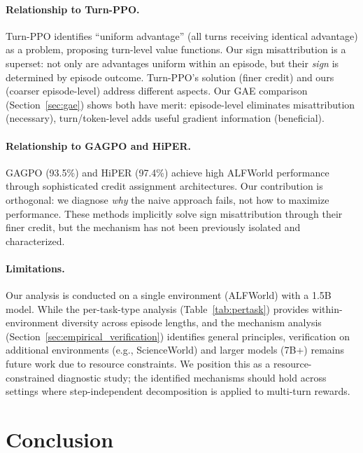 \documentclass[11pt]{article}
\begin{document}
\paragraph{Relationship to Turn-PPO.}
Turn-PPO identifies ``uniform advantage'' (all turns receiving identical advantage) as a problem, proposing turn-level value functions. Our sign misattribution is a superset: not only are advantages uniform within an episode, but their \emph{sign} is determined by episode outcome. Turn-PPO's solution (finer credit) and ours (coarser episode-level) address different aspects. Our GAE comparison (Section~\ref{sec:gae}) shows both have merit: episode-level eliminates misattribution (necessary), turn/token-level adds useful gradient information (beneficial).

\paragraph{Relationship to GAGPO and HiPER.}
GAGPO (93.5\%) and HiPER (97.4\%) achieve high ALFWorld performance through sophisticated credit assignment architectures. Our contribution is orthogonal: we diagnose \emph{why} the naive approach fails, not how to maximize performance. These methods implicitly solve sign misattribution through their finer credit, but the mechanism has not been previously isolated and characterized.

\paragraph{Limitations.}
Our analysis is conducted on a single environment (ALFWorld) with a 1.5B model. While the per-task-type analysis (Table~\ref{tab:pertask}) provides within-environment diversity across episode lengths, and the mechanism analysis (Section~\ref{sec:empirical_verification}) identifies general principles, verification on additional environments (e.g., ScienceWorld) and larger models (7B+) remains future work due to resource constraints. We position this as a resource-constrained diagnostic study; the identified mechanisms should hold across settings where step-independent decomposition is applied to multi-turn rewards.

\section{Conclusion}
\end{document}
